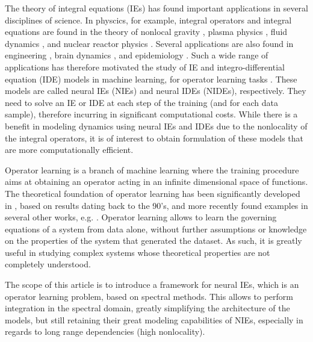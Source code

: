 \documentclass[11pt,fleqn]{amsart} %
\begin{document}
	The theory of integral equations (IEs) has found important applications in several disciplines of science. In physcics, for example, integral operators and integral equations are found in the theory of nonlocal gravity \cite{Nonlocal_Grav}, plasma physics \cite{Plasma_IE}, fluid dynamics \cite{Fluid}, and nuclear reactor physics \cite{Adler}. Several applications are also found in engineering \cite{Eng_IE}, brain dynamics \cite{Amari,WC}, and epidemiology \cite{Epid}. Such a wide range of applications has therefore motivated the study of IE and integro-differential equation (IDE) models in machine learning, for operator learning tasks \cite{NIDE,ANIE,ANIE_NAT}. These models are called neural IEs (NIEs) and neural IDEs (NIDEs), respectively. They need to solve an IE or IDE at each step of the training (and for each data sample), therefore incurring in significant computational costs. While there is a benefit in modeling dynamics using neural IEs and IDEs due to the nonlocality of the integral operators, it is of interest to obtain formulation of these models that are more computationally efficient. 
	
	Operator learning is a branch of machine learning where the training procedure aims at obtaining an operator acting in an infinite dimensional space of functions. The theoretical foundation of operator learning has been significantly developed in \cite{DeepONet}, based on results dating back to the 90's, and more recently found examples in several other works, e.g. \cite{kovachki2023neural,gupta2021multiwavelet,hao2023gnot,lin2021operator}. Operator learning allows to learn the governing equations of a system from data alone, without further assumptions or knowledge on the properties of the system that generated the dataset. As such, it is greatly useful in studying complex systems whose theoretical properties are not completely understood. 
	
	The scope of this article is to introduce a framework for neural IEs, which is an operator learning problem, based on spectral methods. This allows to perform integration in the spectral domain, greatly simplifying the architecture of the models, but still retaining their great modeling capabilities of NIEs, especially in regards to long range dependencies (high nonlocality). 
	
\end{document}
